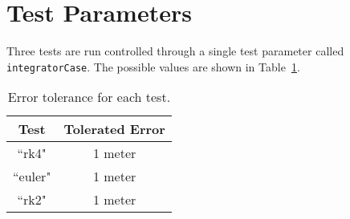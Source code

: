 
\section{Test Parameters}
Three tests are run controlled through a single test parameter called {\tt integratorCase}.  The possible values are shown in Table~\ref{tbl:intCases}.  

\begin{table}[htbp]
	\caption{Error tolerance for each test.}
	\label{tbl:intCases}
	\centering \fontsize{10}{10}\selectfont
	\begin{tabular}{ c | c } %
		\hline\hline
		\textbf{Test}   	      	               & \textbf{Tolerated Error} 						           \\ \hline
		``rk4"                           & 1 meter	  \\ 
		``euler"                           & 1 meter	  \\ 
		``rk2"                           & 1 meter	  \\ 
		\hline\hline
	\end{tabular}
\end{table}

